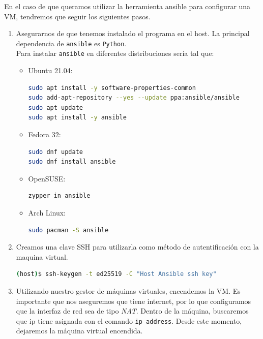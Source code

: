 \documentclass[12pt]{article}
\begin{document}
	\noindent En el caso de que queramos utilizar la herramienta ansible para configurar una VM, tendremos que seguir los siguientes pasos.
	\begin{enumerate}
		\item Asegurarnos de que tenemos instalado el programa en el host. La principal dependencia de \texttt{ansible} es \texttt{Python}. \\
		Para instalar \texttt{ansible} en diferentes distribuciones sería tal que:
		\begin{itemize}
			\item Ubuntu 21.04:
			\begin{lstlisting}[language=Bash,caption={Instalación \texttt{ansible} en Ubuntu}]
sudo apt install -y software-properties-common
sudo add-apt-repository --yes --update ppa:ansible/ansible
sudo apt update
sudo apt install -y ansible
			\end{lstlisting}
			
			\item Fedora 32:
			\begin{lstlisting}[language=Bash,caption={Instalación \texttt{ansible} en Fedora}]
sudo dnf update
sudo dnf install ansible
			\end{lstlisting}
			
			\item OpenSUSE:
			\begin{lstlisting}[language=Bash,caption={Instalación \texttt{ansible} en OpenSUSE}]
zypper in ansible
			\end{lstlisting}
			
			\item Arch Linux:
			\begin{lstlisting}[language=Bash,caption={Instalación \texttt{ansible} en Arch Linux}]
sudo pacman -S ansible
			\end{lstlisting} 
		\end{itemize}
		
		\item Creamos una clave SSH para utilizarla como método de autentificación con la maquina virtual. 
		\begin{lstlisting}[language=Bash, caption={Crear clave SSH para autenticación en VM}]
(host)$ ssh-keygen -t ed25519 -C "Host Ansible ssh key"
		\end{lstlisting}
		
		\pagebreak
		
		\item Utilizando nuestro gestor de máquinas virtuales, encendemos la VM. Es importante que nos aseguremos que tiene internet, por lo que configuramos que la interfaz de red sea de tipo \textit{NAT}. Dentro de la máquina, buscaremos que ip tiene asignada con el comando \texttt{ip address}. Desde este momento, dejaremos la máquina virtual encendida.
		

\end{enumerate}
\end{document}
